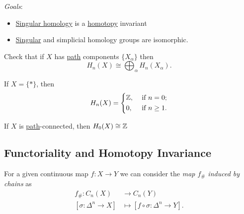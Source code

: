 \emph{Goals}:
\begin{itemize}
	\item \hyperref[def:singular-homology-group]{Singular homology} is a \hyperref[def:homotopy]{homotopy} invariant
	\item \hyperref[def:singular-homology-group]{Singular} and simplicial homology groups are isomorphic.
\end{itemize}

\begin{exercise}
	Check that if \(X\) has \hyperref[def:path]{path} components \(\{X_\alpha\}\) then
	\[
		H_n(X) \cong \bigoplus_\alpha H_n(X_\alpha).
	\]
\end{exercise}

\begin{exercise}
	If \(X = \{\ast\}\), then
	\[
		H_n(X) = \begin{dcases}
			\mathbb{\MakeUppercase{z}}, & \text{ if } n=0 ;     \\
			0,                          & \text{ if } n\geq 1 .
		\end{dcases}
	\]
\end{exercise}

\begin{exercise}
	If \(X\) is \hyperref[def:path]{path}-connected, then $H_0(X) \cong \mathbb{\MakeUppercase{z}} $
\end{exercise}

\subsection{Functoriality and Homotopy Invariance}
\begin{definition}\label{def:induced-map-on-chains}
	For a given continuous map $f \colon X \to Y$ we can consider the \emph{map \(f_{\#}\) induced by chains} as
	\begin{align*}
		f_{\#} \colon C_n(X)           & \to C_n(Y)                                      \\
		[\sigma \colon \Delta^n \to X] & \mapsto [f \circ \sigma \colon \Delta^n \to Y].
	\end{align*}
\end{definition}

